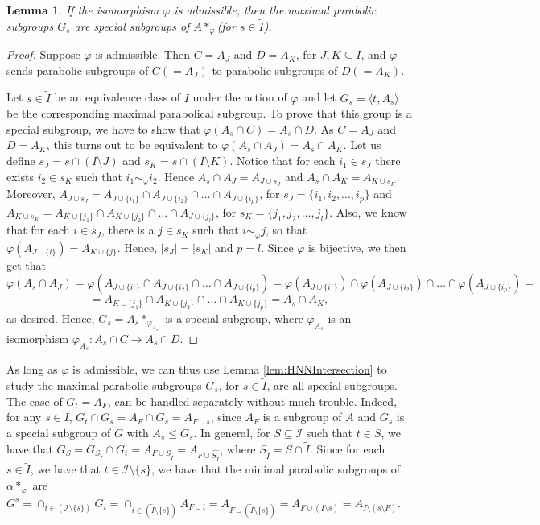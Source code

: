 \documentclass[11pt,letterpaper]{amsart}
\newtheorem{lemma}[prop]{Lemma}
\newcommand{\II}{\mathcal{I}}
\begin{document}
\begin{lemma}
If the isomorphism $\varphi$ is admissible, then the maximal parabolic subgroups $G_s$ are special subgroups of $A *_\varphi$(for $s\in \widetilde{I}$).
\end{lemma}
\begin{proof}
Suppose $\varphi$ is admissible. Then $C=A_J$ and $D=A_K$, for $J,K\subseteq I$, and $\varphi$ sends parabolic subgroups of $C(=A_J)$ to parabolic subgroups of $D(=A_K)$.

Let $s\in \widetilde{I}$ be an equivalence class of $I$ under the action of $\varphi$ and let $G_s=\langle t,A_s\rangle$ be the corresponding maximal parabolical subgroup.
To prove that this group is a special subgroup, we have to show that $\varphi(A_s\cap C) = A_s\cap D$.
As $C=A_J$ and $D=A_K$, this turns out to be equivalent to $\varphi(A_s\cap A_J)=A_s\cap A_K$. Let us define $s_J = s \cap (I\setminus J)$ and $s_K = s\cap (I\setminus K)$.
Notice that for each $i_1\in s_J$ there exists $i_2\in s_K$ such that $i_1\sim_\varphi i_2$.
Hence $A_s\cap A_J = A_{J\cup s_J}$ and $A_s\cap A_K=A_{K\cup s_K}$. Moreover, $A_{J\cup s_J} = A_{J\cup \{i_1\}}\cap A_{J\cup \{i_2\}}\cap \ldots\cap A_{J\cup \{i_p\}}$, for $s_J=\{i_1,i_2,\ldots,i_p\}$ and $A_{K\cup s_K} = A_{K\cup \{j_1\}}\cap A_{K\cup \{j_2\}}\cap \ldots\cap A_{J\cup \{j_l\}}$, for $s_K=\{j_1,j_2,\ldots,j_l\}$.
Also, we know that for each $i\in s_J$, there is a $j\in s_K$ such that $i\sim_\varphi j$, so that $\varphi(A_{J\cup\{i\}})=A_{K\cup \{j\}}$. Hence, $|s_J|=|s_K|$ and $p=l$. Since $\varphi$ is bijective, we then get that
$$\varphi(A_s\cap A_J) = \varphi(A_{J\cup \{i_1\}}\cap A_{J\cup \{i_2\}}\cap \ldots\cap A_{J\cup \{i_p\}}) = \varphi(A_{J\cup \{i_1\}})\cap \varphi(A_{J\cup \{i_2\}})\cap \ldots \cap \varphi(A_{J\cup \{i_p\}}) = $$ 
$$= A_{K\cup \{j_1\}}\cap A_{K\cup \{j_2\}}\cap \ldots\cap A_{K\cup \{j_p\}} = A_s\cap A_K,$$
as desired.
Hence, $G_s=A_s *_{\varphi_{A_s}}$ is a special subgroup, where $\varphi_{A_s}$ is an isomorphism $\varphi_{A_s}: A_s\cap C\to A_s\cap D$.
\end{proof}

As long as $\varphi$ is admissible, we can thus use Lemma \ref{lem:HNNIntersection} to study the maximal parabolic subgroups $G_s$, for $s\in \widetilde{I}$, are all special subgroups. The case of $G_t = A_F$, can be handled separately without much trouble. Indeed, for any $s\in \widetilde{I}$, $G_t\cap G_s = A_F\cap G_s = A_{F\cup s}$, since $A_F$ is a subgroup of $A$ and $G_s$ is a special subgroup of $G$ with $A_{s}\leq G_s$. In general, for $S\subseteq \II$ such that $t\in S$, we have that $G_{S}=G_{S_{\widetilde{I}}}\cap G_t = A_{F\cup S_{\widetilde{I}}} = A_{F\cup \widehat{S_{\widetilde{I}}}}$, where $S_{\widetilde{I}} = S\cap \widetilde{I}$.
Since for each $s\in \widetilde{I} $, we have that $t\in \II\setminus \{s\}$, we have that the minimal parabolic subgroups of $\alpha *_\varphi$ are $G^s = \cap_{i \in (\II\setminus \{s\})} G_i = \cap_{i\in (\widetilde{I}\setminus \{s\})} A_{F\cup i} = A_{F\cup (\widetilde{I}\setminus \{s\})} = A_{F\cup (I\setminus s)}=A_{I\setminus (s\setminus F)}$. 
\end{document}
